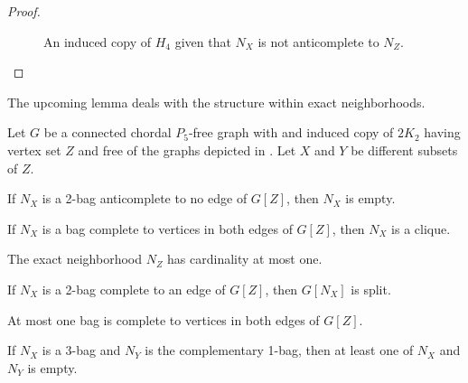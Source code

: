 \begin{proof}
\begin{enumerate}[label=(\roman*)]
\begin{figure}[htb!]
                \caption{An induced copy of $H_4$ given that $N_X$ is not anticomplete to $N_Z$.}
                \label{fig:chordal_anti_2}
            \end{figure}
    \end{enumerate}
\end{proof}

The upcoming lemma deals with the structure within exact neighborhoods.

\begin{lemma}
    \label{lem:neighborhoods_chordal_types}
    Let $G$ be a connected chordal $P_5$-free graph with and induced copy of
    $2K_2$ having vertex set $Z$ and free of the graphs depicted in
    . Let $X$ and $Y$ be different
    subsets of $Z$.
    \begin{lemenum}
        \item If $N_X$ is a 2-bag anticomplete to no edge of $G[Z]$, then $N_X$
            is empty. \label{lem:chordal_types_2}
        \item If $N_X$ is a bag complete to vertices in both edges of $G[Z]$,
            then $N_X$ is a clique. \label{lem:chordal_types_clique_bag}
        \item The exact neighborhood $N_Z$ has cardinality at most one.
            \label{lem:chordal_types_1}
        \item If $N_X$ is a 2-bag complete to an edge of $G[Z]$, then $G[N_X]$
            is split. \label{lem:chordal_types_6}
        \item At most one bag is complete to vertices in both edges of $G[Z]$.
            \label{lem:chordal_types_3}
        \item If $N_X$ is a 3-bag and $N_Y$ is the complementary 1-bag, then at
            least one of $N_X$ and $N_Y$ is empty.
            \label{lem:chordal_types_pending}
    \end{lemenum}
\end{lemma}

